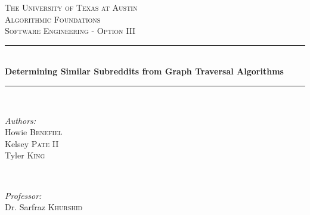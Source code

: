 \begin{titlepage}

\newcommand{\HRule}{\rule{\linewidth}{0.5mm}} %

\center %


\textsc{\LARGE The University of Texas at Austin}\\[1.5cm] %
\textsc{\Large Algorithmic Foundations}\\[0.5cm] %
\textsc{\large Software Engineering - Option III}\\[0.5cm] %


\HRule \\[0.4cm]
{ \huge \bfseries Determining Similar Subreddits from Graph Traversal Algorithms}\\[0.4cm] %
\HRule \\[1.5cm]


\begin{minipage}{0.4\textwidth}
\begin{flushleft} \large
\emph{Authors:}\\
Howie \textsc{Benefiel}\\
Kelsey \textsc{Pate II} \\
Tyler \textsc{King}
\end{flushleft}
\end{minipage}
~
\begin{minipage}{0.4\textwidth}
\begin{flushright} \large
\emph{Professor:} \\
Dr. Sarfraz \textsc{Khurshid} %
\end{flushright}
\end{minipage}\\[2cm]


\end{titlepage}
